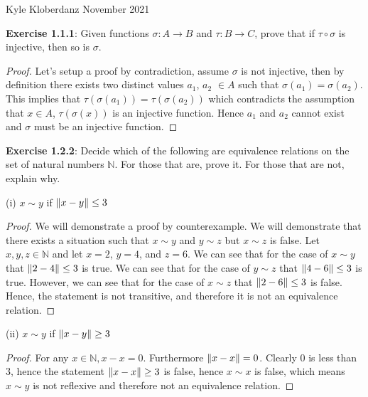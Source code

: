 \documentclass[a4paper]{article}
\DeclarePairedDelimiter{\norm}{\lVert}{\rVert}
\begin{document}
\begin{myparindent}{0pt}

Kyle Kloberdanz  November 2021 \newline

\textbf{Exercise 1.1.1}:
Given functions $\sigma: A \rightarrow B$ and $\tau: B \rightarrow C$,
prove that if $\tau \circ \sigma$ is injective, then so is $\sigma$.

\begin{proof}
Let's setup a proof by contradiction, assume $\sigma$ is not injective, then by
definition there exists two distinct values $a_1$, $a_2$ $\in A$ such that
$\sigma(a_1) = \sigma(a_2)$.
This implies that $\tau(\sigma(a_1)) = \tau(\sigma(a_2))$
which contradicts the assumption that $x \in A$, $\tau(\sigma(x))$ is an injective function.
Hence $a_1$ and $a_2$ cannot exist and $\sigma$ must be an injective function.
\end{proof}

\textbf{Exercise 1.2.2}:
Decide which of the following are equivalence relations on the set of natural numbers $\mathbb{N}$. For those
that are, prove it. For those that are not, explain why. \newline
\newline

(i) $x \sim y$ if $\norm{x - y} \le 3$ \newline
\begin{proof}
We will demonstrate a proof by counterexample.
We will demonstrate that there exists a situation such that $x \sim y$ and $y \sim z$ but $x \sim z$ is false.
Let $x, y, z \in \mathbb{N}$ and let $x = 2$, $y = 4$, and $z = 6$. \newline
\newline
We can see that for the case of $x \sim y$ that $\norm{2 - 4} \le 3$ is true. \newline
We can see that for the case of $y \sim z$ that $\norm{4 - 6} \le 3$ is true. \newline
However, we can see that for the case of $x \sim z$ that $\norm{2 - 6} \le 3$ is false. \newline
Hence, the statement is not transitive, and therefore it is not an equivalence relation.
\end{proof}

(ii) $x \sim y$ if $\norm{x - y} \ge 3$ \newline
\begin{proof}
For any $x \in \mathbb{N}, x - x = 0$. Furthermore $\norm{x - x} = 0$. Clearly 0 is less than 3,
hence the statement $\norm{x - x} \ge 3$ is false,
hence $x \sim x$ is false, which means $x \sim y$ is not reflexive and therefore not an equivalence relation. \newline
\end{proof}


\end{myparindent}
\end{document}
